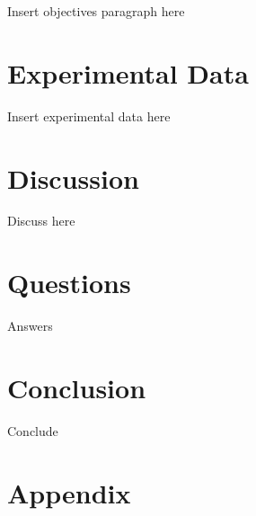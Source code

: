 \documentclass{article}
\begin{document}
Insert objectives paragraph here


 

\section{Experimental Data}

Insert experimental data here


\section{Discussion}

Discuss here


\section{Questions}

Answers

\section{Conclusion}

Conclude


\section{Appendix}
\end{document}
